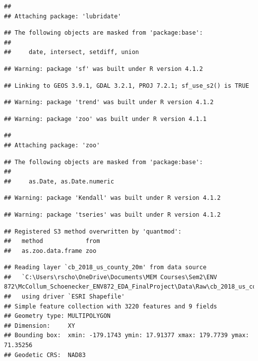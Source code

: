 \documentclass[
  12pt,
]{article}
\begin{document}
\begin{verbatim}
## 
## Attaching package: 'lubridate'
\end{verbatim}

\begin{verbatim}
## The following objects are masked from 'package:base':
## 
##     date, intersect, setdiff, union
\end{verbatim}

\begin{verbatim}
## Warning: package 'sf' was built under R version 4.1.2
\end{verbatim}

\begin{verbatim}
## Linking to GEOS 3.9.1, GDAL 3.2.1, PROJ 7.2.1; sf_use_s2() is TRUE
\end{verbatim}

\begin{verbatim}
## Warning: package 'trend' was built under R version 4.1.2
\end{verbatim}

\begin{verbatim}
## Warning: package 'zoo' was built under R version 4.1.1
\end{verbatim}

\begin{verbatim}
## 
## Attaching package: 'zoo'
\end{verbatim}

\begin{verbatim}
## The following objects are masked from 'package:base':
## 
##     as.Date, as.Date.numeric
\end{verbatim}

\begin{verbatim}
## Warning: package 'Kendall' was built under R version 4.1.2
\end{verbatim}

\begin{verbatim}
## Warning: package 'tseries' was built under R version 4.1.2
\end{verbatim}

\begin{verbatim}
## Registered S3 method overwritten by 'quantmod':
##   method            from
##   as.zoo.data.frame zoo
\end{verbatim}

\begin{verbatim}
## Reading layer `cb_2018_us_county_20m' from data source 
##   `C:\Users\rscho\OneDrive\Documents\MEM Courses\Sem2\ENV 872\McCollum_Schoenecker_ENV872_EDA_FinalProject\Data\Raw\cb_2018_us_county_20m.shp' 
##   using driver `ESRI Shapefile'
## Simple feature collection with 3220 features and 9 fields
## Geometry type: MULTIPOLYGON
## Dimension:     XY
## Bounding box:  xmin: -179.1743 ymin: 17.91377 xmax: 179.7739 ymax: 71.35256
## Geodetic CRS:  NAD83
\end{verbatim}
\end{document}

